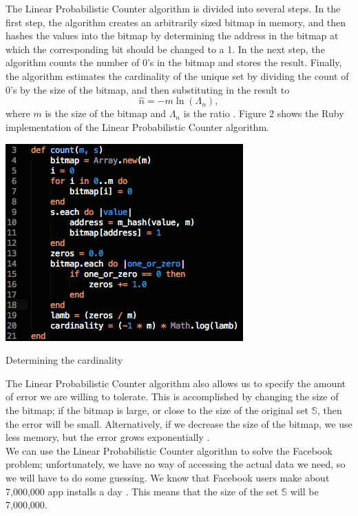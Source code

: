 \documentclass{article}
\begin{document}
\indent The Linear Probabilistic Counter algorithm is divided into several steps. 
In the first step, the algorithm creates an arbitrarily sized bitmap in memory, and then hashes the values into the bitmap by determining the address in the bitmap at which the corresponding bit should be changed to a 1.
In the next step, the algorithm counts the number of 0's in the bitmap and stores the result.
Finally, the algorithm estimates the cardinality of the unique set by dividing the count of 0's by the size of the bitmap, and then substituting in the result to
\[
\hat{n} = -m \ln{(\Lambda_{n})},
\]
where $m$ is the size of the bitmap and $\Lambda_{n}$ is the ratio \cite{Whang}. 
Figure 2 shows the Ruby implementation of the Linear Probabilistic Counter algorithm.
\begin{floatingfigure}[R]{6cm}
\begin{framed}
\centering
\includegraphics[scale=0.4]{fb_problem/lpc}
\caption{Determining the cardinality}
\end{framed}
\end{floatingfigure}
\noindent The Linear Probabilistic Counter algorithm also allows us to specify the amount of error we are willing to tolerate.
This is accomplished by changing the size of the bitmap; if the bitmap is large, or close to the size of the original set $\mathbb{S}$, then the error will be small.
Alternatively, if we decrease the size of the bitmap, we use less memory, but the error grows exponentially \cite{Hoff}.\\
\indent We can use the Linear Probabilistic Counter algorithm to solve the Facebook problem; unfortunately, we have no way of accessing the actual data we need, so we will have to do some guessing. 
We know that Facebook users make about 7,000,000 app installs a day \cite{Facebook-2}.
This means that the size of the set $\mathbb{S}$ will be 7,000,000.
\end{document}
